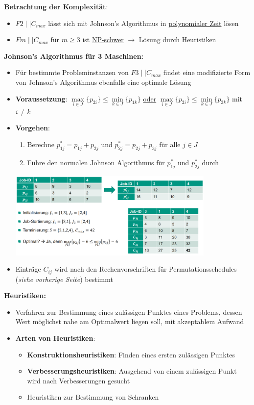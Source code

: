 \textbf{Betrachtung der Komplexität}:
\begin{itemize}
	\item $F2\mid\mid C_{max}$ lässt sich mit Johnson's Algorithmus in \underline{polynomialer Zeit} lösen
	\item $Fm\mid\mid C_{max}$ für $m\geq 3$ ist \underline{NP-schwer} $\rightarrow$ Lösung durch Heuristiken
\end{itemize}
\bigskip
\textbf{Johnson's Algorithmus für 3 Maschinen:}
\begin{itemize}
	\item Für bestimmte Probleminstanzen von $F3\mid\mid C_{max}$ findet eine modifizierte Form von Johnson's Algorithmus ebenfalls eine optimale Lösung
	\item \textbf{Voraussetzung}: $\max\limits_{i\in J}\{p_{2i}\}\leq\min\limits_{k\in J}\{p_{1k}\}$ \underline{oder} $\max\limits_{i\in J}\{p_{2i}\}\leq\min\limits_{k\in J}\{p_{3k}\}$ mit $i\neq k$
	\item \textbf{Vorgehen}: 
	\begin{enumerate}
		\item Berechne $p_{1j}^*=p_{1j}+p_{2j}$ und $p_{2j}^*=p_{2j}+p_{3j}$ für alle $j\in J$
		\item Führe den normalen Johnson Algorithmus für $p_{1j}^*$ und $p_{2j}^*$ durch
	\end{enumerate}
	\begin{center}
		\includegraphics[width=0.8\textwidth]{images/johnson-modified.png}
	\end{center}
	\item Einträge $C_{ij}$ wird nach den Rechenvorschriften für Permutationsschedules (\textit{siehe vorherige Seite}) bestimmt
\end{itemize}
\bigskip
\textbf{Heuristiken:}
\begin{itemize}
	\item Verfahren zur Bestimmung eines zulässigen Punktes eines Problems, dessen Wert möglichst nahe am Optimalwert liegen soll, mit akzeptablem Aufwand
	\item \textbf{Arten von Heuristiken}:
	\begin{itemize}
		\item \textbf{Konstruktionsheuristiken}: Finden eines ersten zulässigen Punktes
		\item \textbf{Verbesserungsheuristiken}: Ausgehend von einem zulässigen Punkt wird nach Verbesserungen gesucht
		\item Heuristiken zur Bestimmung von Schranken
	\end{itemize}
\end{itemize}
